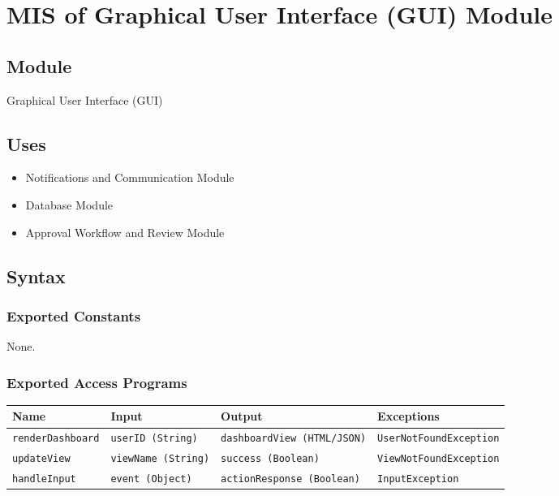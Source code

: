 \documentclass[12pt, titlepage]{article}
\begin{document}
\section{MIS of Graphical User Interface (GUI) Module}

\subsection{Module}
Graphical User Interface (GUI)

\subsection{Uses}
\begin{itemize}
    \item Notifications and Communication Module
    \item Database Module
    \item Approval Workflow and Review Module
\end{itemize}

\subsection{Syntax}

\subsubsection{Exported Constants}
None.

\subsubsection{Exported Access Programs}
\begin{center}
    \begin{tabular}{|p{3cm}|p{4cm}|p{4cm}|p{4cm}|}
        \hline
        \textbf{Name} & \textbf{Input} & \textbf{Output} & \textbf{Exceptions} \\
        \hline
        \texttt{renderDashboard} & \texttt{userID (String)} & \texttt{dashboardView (HTML/JSON)} & \texttt{UserNotFoundException} \\
        \hline
        \texttt{updateView} & \texttt{viewName (String)} & \texttt{success (Boolean)} & \texttt{ViewNotFoundException} \\
        \hline
        \texttt{handleInput} & \texttt{event (Object)} & \texttt{actionResponse (Boolean)} & \texttt{InputException} \\
        \hline
    \end{tabular}
\end{center}
\end{document}
